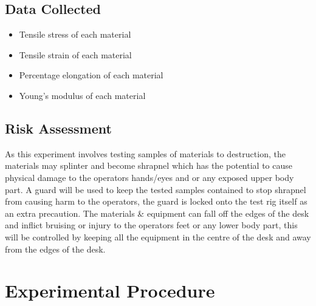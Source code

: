\documentclass[11pt]{article}
\begin{document}
\begin{multicols}{2}
\subsection{Data Collected}
\label{Data Collected SubSection}

\begin{itemize}
    \item{Tensile stress of each material}
    \item{Tensile strain of each material}
    \item{Percentage elongation of each material}
    \item{Young's modulus of each material}
\end{itemize}


\subsection{Risk Assessment}
\label{Risk Assessment SubSection}

As this experiment involves testing samples of materials to destruction, the materials may splinter and become shrapnel which has the potential to cause physical damage to the operators hands/eyes and or any exposed upper body part. A guard will be used to keep the tested samples contained to stop shrapnel from causing harm to the operators, the guard is locked onto the test rig itself as an extra precaution. The materials \& equipment can fall off the edges of the desk and inflict bruising or injury to the operators feet or any lower body part, this will be controlled by keeping all the equipment in the centre of the desk and away from the edges of the desk.


\section{Experimental Procedure}
\label{Experimental Procedure Section}



\end{multicols}
\end{document}
